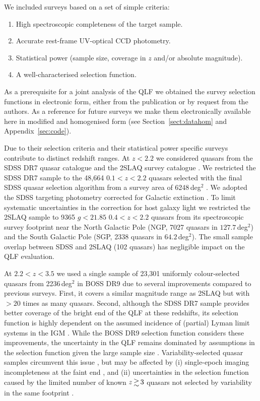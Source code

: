 \documentclass[fleqn,usenatbib]{mnras}
\begin{document}
We included surveys based on a set of simple criteria:
\begin{enumerate}
\item High spectroscopic completeness of the target sample.
\item Accurate rest-frame UV-optical CCD photometry.
\item Statistical power (sample size, coverage in $z$ and/or absolute magnitude).
\item A well-characterised selection function.
\end{enumerate}
As a prerequisite for a joint analysis of the QLF we obtained the
survey selection functions in electronic form, either from the
publication or by request from the authors. As a reference for future
surveys we make them electronically available here in modified and
homogenised form (see Section~\ref{sect:datahom} and
Appendix~\ref{sec:code}).

Due to their selection criteria and their statistical power specific
surveys contribute to distinct redshift ranges. At $z<2.2$ we
considered quasars from the SDSS DR7 quasar catalogue
\citep{2010AJ....139.2360S} and the 2SLAQ survey catalogue
\citep{2009MNRAS.392...19C}. We restricted the SDSS DR7 sample to the
48,664 $0.1<z<2.2$ quasars selected with the final SDSS quasar
selection algorithm \citep{2002AJ....123.2945R, 2006AJ....131.2766R}
from a survey area of 6248\,deg$^2$ \citep{2012ApJ...746..169S}. We
adopted the SDSS targeting photometry corrected for Galactic
extinction \citep{2010AJ....139.2360S}. To limit systematic
uncertainties in the correction for host galaxy light \citep[detailed
  in][]{2009MNRAS.392...19C} we restricted the 2SLAQ sample to 9365
$g<21.85$ $0.4<z<2.2$ quasars from its spectroscopic survey footprint
near the North Galactic Pole (NGP, 7027 quasars in $127.7$\,deg$^2$)
and the South Galactic Pole (SGP, 2338 quasars in
$64.2$\,deg$^2$). The small sample overlap between SDSS and 2SLAQ (102
quasars) has negligible impact on the QLF evaluation.

At $2.2<z<3.5$ we used a single sample of 23,301 uniformly
colour-selected quasars from 2236\,deg$^2$ in BOSS DR9
\citep{2013ApJ...773...14R} due to several improvements compared to
previous surveys. First, it covers a similar magnitude range as 2SLAQ
but with $>20$ times as many quasars. Second, although the SDSS DR7
sample provides better coverage of the bright end of the QLF at these
redshifts, its selection function is highly dependent on the assumed
incidence of (partial) Lyman limit systems in the IGM
\citep{2009ApJ...705L.113P, 2011ApJ...728...23W}. While the BOSS DR9
selection function considers these improvements, the uncertainty in
the QLF remains dominated by assumptions in the selection function
given the large sample size
\citep{2013ApJ...773...14R}. Variability-selected quasar samples
circumvent this issue \citep{2013ApJ...773...14R, 2013A&A...551A..29P,
  2016A&A...587A..41P}, but may be affected by (i) single-epoch
imaging incompleteness at the faint end \citep{2013ApJ...773...14R},
and (ii) uncertainties in the selection function caused by the limited
number of known $z\ga 3$ quasars not selected by variability in the
same footprint \citep{2013A&A...551A..29P, 2016A&A...587A..41P}.
\end{document}
